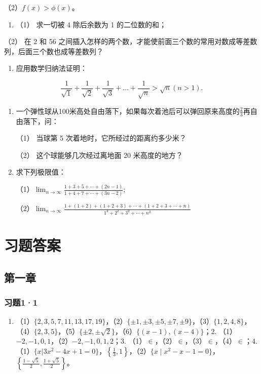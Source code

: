 （2）\(f(x) > \phi (x)\)。

\begin{enumerate}[start=7]
\item
  （1） 求一切被 4 除后余数为 1 的二位数的和；
\end{enumerate}

（2） 在 2 和 56
之间插入怎样的两个数，才能使前面三个数的常用对数成等差数列，后面三个数也成等差数列？

\begin{enumerate}[start=8]
\item
  应用数学归纳法证明：
\end{enumerate}

\[
\frac{1}{\sqrt{1}} + \frac{1}{\sqrt{2}} + \frac{1}{\sqrt{3}} + \dots + \frac{1}{\sqrt{n}} > \sqrt{n} (n > 1).
\]

\begin{enumerate}[start=9,label={*\arabic*.}]
\item
  一个弹性球从100米高处自由落下，如果每次着池后可以弹回原来高度的\(\frac{2}{3}\)再自由落下，问：

（1） 当球第 5 次着地时，它所经过的距离约多少米？

（2） 这个球能够几次经过离地面 20 米高度的地方？

\item
  求下列极限值：

（1）\(\lim_{n\to \infty}\frac{1 + 3 + 5 + \cdots + (2n - 1)}{1 + 4 + 7 + \cdots + (3n - 2)};\)

（2）\(\lim_{n\to \infty}\frac{1 + (1 + 2) + (1 + 2 + 3) + \cdots + (1 + 2 + 3 + \cdots + n)}{1^2 + 2^2 + 3^2 + \cdots + n^2}\)

\end{enumerate}
\chapter{习题答案}

\section{第一章}

\subsection{习题1·1}

\begin{enumerate}
\item
  （1）\(\{2,3,5,7,11,13,17,19\}\)，（2）\(\{\pm 1, \pm 3, \pm 5, \pm 7, \pm 9\}\)，（3）\(\{1, 2, 4, 8\}\)，（4）\(\{2, 3, 5\}\)，（5）\(\{\pm 2, \pm \sqrt{2}\}\)，（6）\(\{(x-1), (x-4)\}\)；2.
  （1）\(-2, -1, 0, 1\)，（2）\(-2, -1, 0, 1, 2\)；3.
  （1）\(\in\)，（2）\(\in\)，（3）\(\in\)，（4）\(\in\)；4.
  （1）\(\{x|3x^2-4x+1=0\}\)，\(\left\{\frac{1}{3}, 1\right\}\)，（2）\(\{x\mid x^2-x-1=0\}\)，\(\left\{\frac{1-\sqrt5}{2},\frac{1+\sqrt5}{2}\right\}\)。
\end{enumerate}

